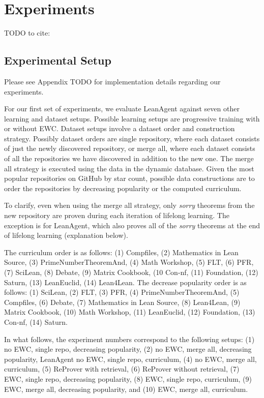 \documentclass{article} %
\begin{document}
\section{Experiments}
\label{sec:experiments}

TODO to cite:

\subsection{Experimental Setup}

Please see Appendix TODO for implementation details regarding our experiments.

For our first set of experiments, we evaluate LeanAgent against seven other learning and dataset setups. Possible learning setups are progressive training with or without EWC. Dataset setups involve a dataset order and construction strategy. Possibly dataset orders are single repository, where each dataset consists of just the newly discovered repository, or merge all, where each dataset consists of all the repositories we have discovered in addition to the new one. The merge all strategy is executed using the data in the dynamic database. Given the most popular repositories on GitHub by star count, possible data constructions are to order the repositories by decreasing popularity or the computed curriculum.

To clarify, even when using the merge all strategy, only \textit{sorry} theorems from the new repository are proven during each iteration of lifelong learning. The exception is for LeanAgent, which also proves all of the \textit{sorry} theorems at the end of lifelong learning (explanation below).

The curriculum order is as follows: (1) Compfiles, (2) Mathematics in Lean Source, (3) PrimeNumberTheoremAnd, (4) Math Workshop, (5) FLT, (6) PFR, (7) SciLean, (8) Debate, (9) Matrix Cookbook, (10 Con-nf, (11) Foundation, (12) Saturn, (13) LeanEuclid, (14) Lean4Lean. The decrease popularity order is as follows: (1) SciLean, (2) FLT, (3) PFR, (4) PrimeNumberTheoremAnd, (5) Compfiles, (6) Debate, (7) Mathematics in Lean Source, (8) Lean4Lean, (9) Matrix Cookbook, (10) Math Workshop, (11) LeanEuclid, (12) Foundation, (13) Con-nf, (14) Saturn.

In what follows, the experiment numbers correspond to the following setups: (1) no EWC, single repo, decreasing popularity, (2) no EWC, merge all, decreasing popularity, LeanAgent no EWC, single repo, curriculum, (4) no EWC, merge all, curriculum, (5) ReProver with retrieval, (6) ReProver without retrieval, (7) EWC, single repo, decreasing popularity, (8) EWC, single repo, curriculum, (9) EWC, merge all, decreasing popularity, and (10) EWC, merge all, curriculum.
\end{document}
